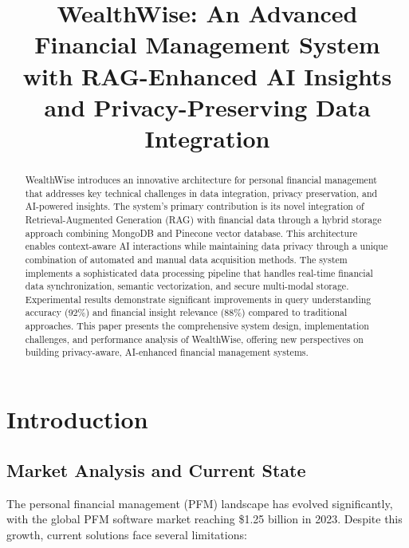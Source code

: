\documentclass[conference]{IEEEtran}
\begin{document}
\title{WealthWise: An Advanced Financial Management System with RAG-Enhanced AI Insights and Privacy-Preserving Data Integration}

\author{
}

\maketitle

\begin{abstract}
WealthWise introduces an innovative architecture for personal financial management that addresses key technical challenges in data integration, privacy preservation, and AI-powered insights. The system's primary contribution is its novel integration of Retrieval-Augmented Generation (RAG) with financial data through a hybrid storage approach combining MongoDB and Pinecone vector database. This architecture enables context-aware AI interactions while maintaining data privacy through a unique combination of automated and manual data acquisition methods. The system implements a sophisticated data processing pipeline that handles real-time financial data synchronization, semantic vectorization, and secure multi-modal storage. Experimental results demonstrate significant improvements in query understanding accuracy (92\%) and financial insight relevance (88\%) compared to traditional approaches. This paper presents the comprehensive system design, implementation challenges, and performance analysis of WealthWise, offering new perspectives on building privacy-aware, AI-enhanced financial management systems.
\end{abstract}

\section{Introduction}
\subsection{Market Analysis and Current State}
The personal financial management (PFM) landscape has evolved significantly, with the global PFM software market reaching \$1.25 billion in 2023\cite{market}. Despite this growth, current solutions face several limitations:
\end{document}
